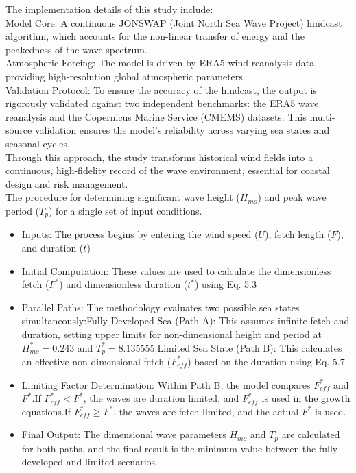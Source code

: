 \documentclass[11pt,a4paper]{article}
\begin{document}
The implementation details of this study include:\\

Model Core: A continuous JONSWAP (Joint North Sea Wave Project) hindcast algorithm, which accounts for the non-linear transfer of energy and the peakedness of the wave spectrum.\\

Atmospheric Forcing: The model is driven by ERA5 wind reanalysis data, providing high-resolution global atmospheric parameters.\\

Validation Protocol: To ensure the accuracy of the hindcast, the output is rigorously validated against two independent benchmarks: the ERA5 wave reanalysis and the Copernicus Marine Service (CMEMS) datasets. This multi-source validation ensures the model's reliability across varying sea states and seasonal cycles.\\

Through this approach, the study transforms historical wind fields into a continuous, high-fidelity record of the wave environment, essential for coastal design and risk management.\\

 The procedure for determining significant wave height ($H_{mo}$) and peak wave period ($T_p$) for a single set of input conditions.\\

\begin{itemize}
  \item Inputs: The process begins by entering the wind speed ($U$), fetch length ($F$), and duration ($t$)
  \item Initial Computation: These values are used to calculate the dimensionless fetch ($F^*$) and dimensionless duration ($t^*$) using Eq. 5.3
  \item Parallel Paths: The methodology evaluates two possible sea states simultaneously:Fully Developed Sea (Path A): This assumes infinite fetch and duration, setting upper limits for non-dimensional height and period at $H_{mo}^* = 0.243$ and $T_p^* = 8.13$5555.Limited Sea State (Path B): This calculates an effective non-dimensional fetch ($F_{eff}^*$) based on the duration using Eq. 5.7
  \item Limiting Factor Determination: Within Path B, the model compares $F_{eff}^*$ and $F^*$.If $F_{eff}^* < F^*$, the waves are duration limited, and $F_{eff}^*$ is used in the growth equations.If $F_{eff}^* \ge F^*$, the waves are fetch limited, and the actual $F^*$ is used.
  \item Final Output: The dimensional wave parameters $H_{mo}$ and $T_p$ are calculated for both paths, and the final result is the minimum value between the fully developed and limited scenarios.
\end{itemize}
\end{document}
